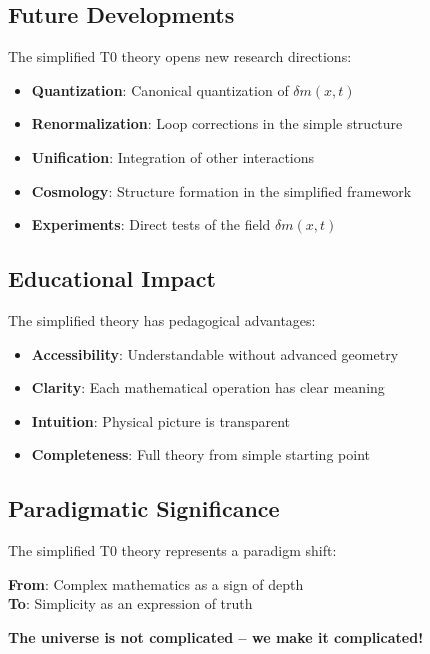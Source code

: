 \documentclass[12pt,a4paper]{article}
\newcommand{\deltam}{\delta m}
\theoremstyle{definition}
\theoremstyle{remark}
\begin{document}
	\subsection{Future Developments}
	
	The simplified T0 theory opens new research directions:
	
	\begin{itemize}
		\item \textbf{Quantization}: Canonical quantization of $\deltam(x,t)$
		\item \textbf{Renormalization}: Loop corrections in the simple structure
		\item \textbf{Unification}: Integration of other interactions
		\item \textbf{Cosmology}: Structure formation in the simplified framework
		\item \textbf{Experiments}: Direct tests of the field $\deltam(x,t)$
	\end{itemize}
	
	\subsection{Educational Impact}
	
	The simplified theory has pedagogical advantages:
	
	\begin{itemize}
		\item \textbf{Accessibility}: Understandable without advanced geometry
		\item \textbf{Clarity}: Each mathematical operation has clear meaning
		\item \textbf{Intuition}: Physical picture is transparent
		\item \textbf{Completeness}: Full theory from simple starting point
	\end{itemize}
	
	\subsection{Paradigmatic Significance}
	
	\begin{tcolorbox}[colback=red!5!white,colframe=red!75!black,title=Paradigmatic Shift]
		The simplified T0 theory represents a paradigm shift:
		
		\textbf{From}: Complex mathematics as a sign of depth \\
		\textbf{To}: Simplicity as an expression of truth
		
		\textbf{The universe is not complicated -- we make it complicated!}
	\end{tcolorbox}
	
\end{document}

